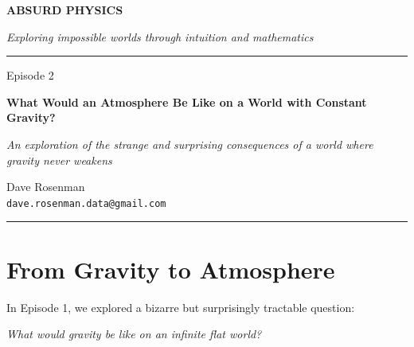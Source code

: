 \documentclass[11pt, letterpaper]{article}
\begin{document}

\begin{center}
\vspace*{1.5cm}

{\fontsize{36}{42}\selectfont\bfseries\textcolor{accentblue}{ABSURD PHYSICS}}

\vspace{8pt}
{\large\textcolor{seriestitle}{\textit{Exploring impossible worlds through intuition and mathematics}}}

\vspace{1.5cm}
\rule{0.6\textwidth}{0.5pt}
\vspace{1.5cm}

{\fontsize{24}{30}\selectfont Episode 2}

\vspace{10pt}

{\fontsize{28}{34}\selectfont\bfseries What Would an Atmosphere Be Like on a World with Constant Gravity?}

\vspace{8pt}
{\large\textit{An exploration of the strange and surprising consequences of a world where gravity never weakens}}

\vspace{1.5cm}

{\large Dave Rosenman}\\[4pt]
{\normalsize \texttt{dave.rosenman.data@gmail.com}}

\vspace{1.5cm}
\rule{0.6\textwidth}{0.5pt}
\end{center}

\vspace{1cm}


\section*{From Gravity to Atmosphere}

In Episode 1, we explored a bizarre but surprisingly tractable question:

\begin{center}
\textit{What would gravity be like on an infinite flat world?}
\end{center}
\end{document}
